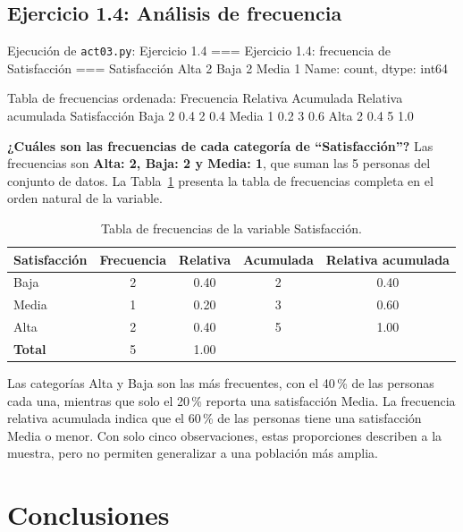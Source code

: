 \documentclass[11pt,letterpaper]{article}
\begin{document}
\subsection{Ejercicio 1.4: Análisis de frecuencia}

\begin{consola}[label=out:ej14]{Ejecución de \texttt{act03.py}: Ejercicio 1.4}
=== Ejercicio 1.4: frecuencia de Satisfacción ===
Satisfacción
Alta     2
Baja     2
Media    1
Name: count, dtype: int64

Tabla de frecuencias ordenada:
              Frecuencia  Relativa  Acumulada  Relativa acumulada
Satisfacción
Baja                   2       0.4          2                 0.4
Media                  1       0.2          3                 0.6
Alta                   2       0.4          5                 1.0
\end{consola}

\textbf{¿Cuáles son las frecuencias de cada categoría de ``Satisfacción''?} Las frecuencias son \textbf{Alta: 2, Baja: 2 y Media: 1}, que suman las 5 personas del conjunto de datos. La Tabla~\ref{tab:frecuencias} presenta la tabla de frecuencias completa en el orden natural de la variable.

\begin{table}[htbp]
\centering
\caption{Tabla de frecuencias de la variable Satisfacción.}
\label{tab:frecuencias}
\begin{tabular}{lcccc}
\hline
\textbf{Satisfacción} & \textbf{Frecuencia} & \textbf{Relativa} & \textbf{Acumulada} & \textbf{Relativa acumulada} \\
\hline
Baja  & 2 & 0.40 & 2 & 0.40 \\
Media & 1 & 0.20 & 3 & 0.60 \\
Alta  & 2 & 0.40 & 5 & 1.00 \\
\hline
\textbf{Total} & 5 & 1.00 & & \\
\hline
\end{tabular}
\end{table}

Las categorías Alta y Baja son las más frecuentes, con el 40\,\% de las personas cada una, mientras que solo el 20\,\% reporta una satisfacción Media. La frecuencia relativa acumulada indica que el 60\,\% de las personas tiene una satisfacción Media o menor. Con solo cinco observaciones, estas proporciones describen a la muestra, pero no permiten generalizar a una población más amplia.

\section{Conclusiones}
\end{document}
